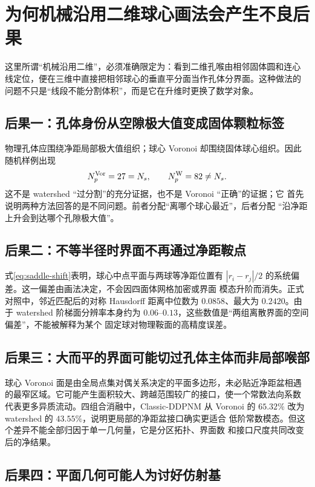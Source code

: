 \documentclass[UTF8,zihao=-4]{ctexart}
\begin{document}
\section{为何机械沿用二维球心画法会产生不良后果}

这里所谓``机械沿用二维''，必须准确限定为：看到二维孔喉由相邻固体圆和连心
线定位，便在三维中直接把相邻球心的垂直平分面当作孔体分界面。这种做法的
问题不只是``线段不能分割体积''，而是它在升维时更换了数学对象。

\subsection{后果一：孔体身份从空隙极大值变成固体颗粒标签}

物理孔体应围绕净距局部极大值组织；球心 Voronoi 却围绕固体球心组织。因此
随机样例出现
\begin{equation}
N_p^{\rm Vor}=27=N_s,\qquad
  N_p^{\rm W}=82\ne N_s.
\end{equation}
这不是 watershed ``过分割''的充分证据，也不是 Voronoi ``正确''的证据；它
首先说明两种方法回答的是不同问题。前者分配``离哪个球心最近''，后者分配
``沿净距上升会到达哪个孔隙极大值''。

\subsection{后果二：不等半径时界面不再通过净距鞍点}

式\eqref{eq:saddle-shift}表明，球心中点平面与两球等净距位置有
$|r_i-r_j|/2$ 的系统偏差。这一偏差由画法决定，不会因四面体网格加密或界面
模态升阶而消失。正式对照中，邻近匹配后的对称 Hausdorff 距离中位数为
$0.0858$、最大为 $0.2420$。由于 watershed 阶梯面分辨率本身约为
$0.06$--$0.13$，这些数值是``两组离散界面的空间偏差''，不能被解释为某个
固定球对物理鞍面的高精度误差。

\subsection{后果三：大而平的界面可能切过孔体主体而非局部喉部}

球心 Voronoi 面是由全局点集对偶关系决定的平面多边形，未必贴近净距盆相遇
的最窄区域。它可能产生面积较大、跨越范围较广的接口，使一个常数法向系数
代表更多异质流动。四组合消融中，Classic-DDPNM 从 Voronoi 的
$65.32\%$ 改为 watershed 的 $43.55\%$，说明更局部的净距盆接口确实更适合
低阶常数模态。但这个差异不能全部归因于单一几何量，它是分区拓扑、界面数
和接口尺度共同改变后的净结果。

\subsection{后果四：平面几何可能人为讨好仿射基}
\end{document}
